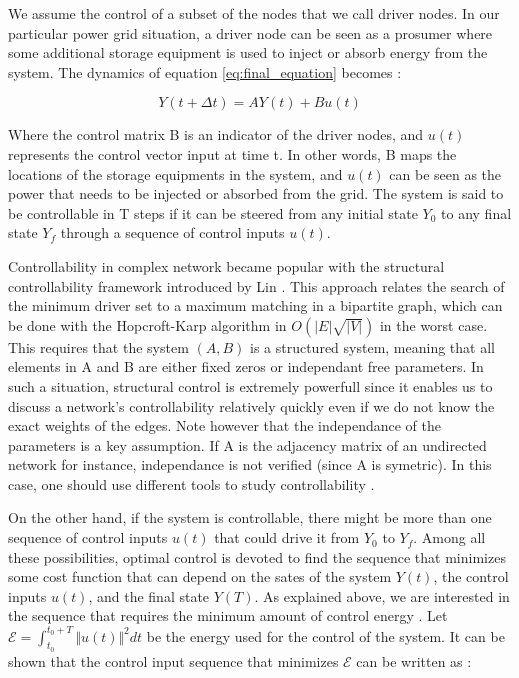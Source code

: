 \documentclass[conference]{IEEEtran}
\begin{document}
We assume the control of a subset of the nodes that we call driver nodes. In our particular power grid situation, a driver node can be seen as a prosumer where some additional storage equipment is used to inject or absorb energy from the system. The dynamics of equation \ref{eq:final_equation} becomes :


\begin{equation}
\label{eq:final_with_control}
 Y(t+\Delta t) = A Y(t) + B u(t) 
\end{equation}


Where the control matrix B is an indicator of the driver nodes, and $ u(t) $ represents the control vector input at time t. In other words, B maps the locations of the storage equipments in the system, and $u(t)$ can be seen as the power that needs to be injected or absorbed from the grid. The system is said to be controllable in T steps if it can be steered from any initial state $ Y_0 $ to any final state $ Y_f $ through a sequence of control inputs $ u(t) $. 

Controllability in complex network became popular with the structural controllability framework introduced by Lin \cite{1100557}. This approach relates the search of the minimum driver set to a maximum matching in a bipartite graph, which can be done with the Hopcroft-Karp algorithm in $ O(|E|\sqrt{|V|}) $ in the worst case. This requires that the system $(A,B)$ is a structured system, meaning that all elements in A and B are either fixed zeros or independant free parameters. In such a situation, structural control is extremely powerfull since it enables us to discuss a network's controllability relatively quickly even if we do not know the exact weights of the edges. Note however that the independance of the parameters is a key assumption. If A is the adjacency matrix of an undirected network for instance, independance is not verified (since A is symetric). In this case, one should use different tools to study controllability \cite{Yuan2014}. 

On the other hand, if the system is controllable, there might be more than one sequence of control inputs $u(t)$ that could drive it from $Y_0$ to $Y_f$. Among all these possibilities, optimal control is devoted to find the sequence that minimizes some cost function that can depend on the sates of the system $Y(t)$, the control inputs $u(t)$, and the final state $Y(T)$. As explained above, we are interested in the sequence that requires the minimum amount of control energy \cite{Yan2012}. Let $ \mathcal{E} = \int_{t_0}^{t_0+T} \Vert u(t) \Vert^2 dt $ be the energy used for the control of the system. It can be shown \cite{Liu2015} that the control input sequence that minimizes $ \mathcal{E} $ can be written as :
\end{document}
